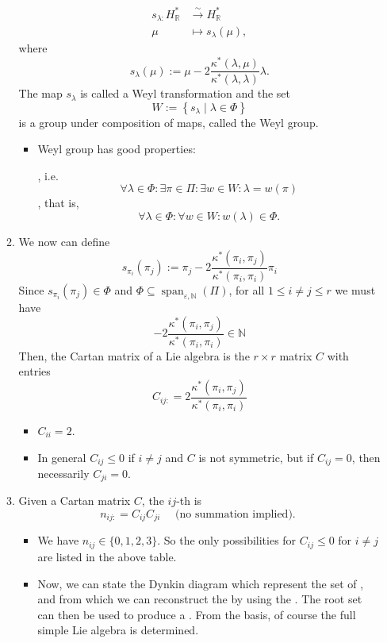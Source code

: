 \documentclass{article}
\begin{document}
\begin{enumerate}
\begin{enumerate}
$$
\begin{aligned}
s_{\lambda:} H_{\mathbb{R}}^{*} & \stackrel{\sim}{\rightarrow} H_{\mathbb{R}}^{*} \\
\mu & \mapsto s_{\lambda}(\mu),
\end{aligned}
$$
where
$$
s_{\lambda}(\mu):=\mu-2 \frac{\kappa^{*}(\lambda, \mu)}{\kappa^{*}(\lambda, \lambda)} \lambda .
$$
The map $s_{\lambda}$ is called a Weyl transformation and the set
$$
W:=\left\{s_{\lambda} \mid \lambda \in \Phi\right\}
$$
is a group under composition of maps, called the Weyl group.
\begin{itemize}
    \item  Weyl group has good properties: 
    
    , i.e.
$$
\forall \lambda \in \Phi: \exists \pi \in \Pi: \exists w \in W: \lambda=w(\pi)
$$
, that is,
$$
\forall \lambda \in \Phi: \forall w \in W: w(\lambda) \in \Phi .
$$
\end{itemize}
\item We now can define 
$$
s_{\pi_{i}}\left(\pi_{j}\right):=\pi_{j}-2 \frac{\kappa^{*}\left(\pi_{i}, \pi_{j}\right)}{\kappa^{*}\left(\pi_{i}, \pi_{i}\right)} \pi_{i}
$$
Since $s_{\pi_{i}}\left(\pi_{j}\right) \in \Phi$ and $\Phi \subseteq \operatorname{span}_{\varepsilon, \mathbb{N}}(\Pi)$, for all $1 \leq i \neq j \leq r$ we must have
$$
-2 \frac{\kappa^{*}\left(\pi_{i}, \pi_{j}\right)}{\kappa^{*}\left(\pi_{i}, \pi_{i}\right)} \in \mathbb{N}
$$
Then, the Cartan matrix of a Lie algebra is the $r \times r$ matrix $C$ with entries
$$
C_{i j:}=2 \frac{\kappa^{*}\left(\pi_{i}, \pi_{j}\right)}{\kappa^{*}\left(\pi_{i}, \pi_{i}\right)}
$$
\begin{itemize}
    \item $C_{ii}=2$. 
    \item In general $C_{ij}\le 0$ if $i\ne j$ and $C$ is not symmetric, but if $C_{ij} = 0$, then necessarily $C_{ji}= 0$.
\end{itemize}
\item  Given a Cartan matrix $C$, the $i j$-th  is
$$
n_{i j:}=C_{i j} C_{j i} \quad \text { (no summation implied). }
$$
\begin{itemize}
    \item We have $n_{i j}\in \{0, 1,2,3\}$. So  the only possibilities    for $C_{i j} \leq 0$ for $i \neq j$ are listed in the above table.

\item Now, we can state the Dynkin diagram which  represent the set of , and from which we can reconstruct the  by using the . The root set can then be used to produce a . From the basis, of course the full simple Lie algebra is determined.
\end{itemize}
\end{enumerate}
\end{enumerate}
\end{document}
